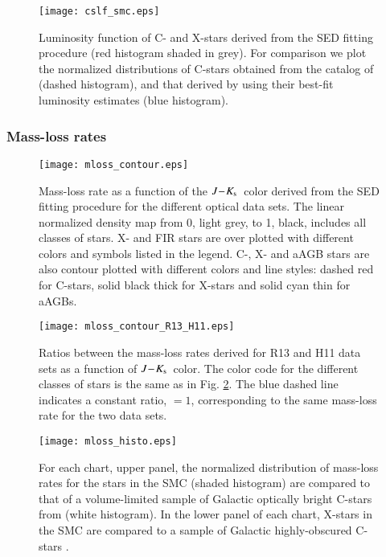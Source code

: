 \documentclass[useAMS,usenatbib]{mn2e/mn2e}
\newcommand{\jks}{\mbox{$J\!-\!K_{\rm s}$}}
\begin{document}
\begin{figure}
\texttt{[image: cslf\_smc.eps]}
        \caption{Luminosity function of C- and X-stars
derived from the SED fitting procedure (red histogram shaded in grey). For comparison we plot the normalized distributions of C-stars obtained from the catalog of \citet{Rebeirot_etal93}
(dashed histogram), and that derived by \citet{Srinivasan16} using their best-fit luminosity estimates (blue histogram).}
        \label{L_func}
        \end{figure}

\subsubsection[trim= 1cm 0 0 0]{Mass-loss rates}\label{sec:ml}
\begin{figure*}
\texttt{[image: mloss\_contour.eps]}
        \caption{Mass-loss rate as a function of the \jks\ color derived from the SED fitting procedure for the different optical data sets. The linear normalized density map from 0, light grey, to 1, black, includes all classes of stars. X- and FIR stars are over plotted with different colors and symbols listed in the legend. C-, X- and aAGB stars are also contour plotted with different colors and line styles: dashed red for C-stars, solid black thick for X-stars and solid cyan thin for aAGBs.}
        \label{ml}
        \end{figure*}

\begin{figure}
\texttt{[image: mloss\_contour\_R13\_H11.eps]}
        \caption{Ratios between the mass-loss rates derived for R13 and H11 data sets as a function of \jks\ color. The color code for the different classes of stars is the same as in Fig. \ref{ml}. The blue dashed line indicates a constant ratio, $=1$, corresponding to the same mass-loss rate for the two data sets.}
        \label{ml_op}
        \end{figure}

\begin{figure*}
\texttt{[image: mloss\_histo.eps]}
        \caption{For each chart, upper panel, the normalized distribution of mass-loss rates for the stars in the SMC (shaded histogram) are compared to that of a volume-limited sample of Galactic optically bright C-stars from \citet{Schoier01} (white histogram). In the lower panel of each chart, X-stars in the SMC are compared to a sample of Galactic highly-obscured C-stars \citep{Groenewegen02}.}
        \label{ml_comp}
        \end{figure*}
\end{document}
